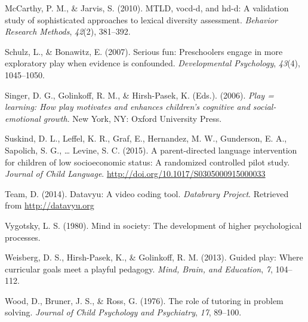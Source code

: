 \documentclass[10pt, letterpaper]{article}
\begin{document}
\hypertarget{ref-McCarthy2010}{}
McCarthy, P. M., \& Jarvis, S. (2010). MTLD, vocd-d, and hd-d: A
validation study of sophisticated approaches to lexical diversity
assessment. \emph{Behavior Research Methods}, \emph{42}(2), 381--392.

\hypertarget{ref-Schulz2007}{}
Schulz, L., \& Bonawitz, E. (2007). Serious fun: Preschoolers engage in
more exploratory play when evidence is confounded. \emph{Developmental
Psychology}, \emph{43}(4), 1045--1050.

\hypertarget{ref-Singer2006}{}
Singer, D. G., Golinkoff, R. M., \& Hirsh-Pasek, K. (Eds.). (2006).
\emph{Play = learning: How play motivates and enhances children's
cognitive and social-emotional growth}. New York, NY: Oxford University
Press.

\hypertarget{ref-Suskind2015}{}
Suskind, D. L., Leffel, K. R., Graf, E., Hernandez, M. W., Gunderson, E.
A., Sapolich, S. G., \ldots{} Levine, S. C. (2015). A parent-directed
language intervention for children of low socioeconomic status: A
randomized controlled pilot study. \emph{Journal of Child Language}.
\url{http://doi.org/10.1017/S0305000915000033}

\hypertarget{ref-datavyu}{}
Team, D. (2014). Datavyu: A video coding tool. \emph{Databrary Project}.
Retrieved from \url{http://datavyu.org}

\hypertarget{ref-Vygotsky1980}{}
Vygotsky, L. S. (1980). Mind in society: The development of higher
psychological processes.

\hypertarget{ref-Weisberg2013}{}
Weisberg, D. S., Hirsh-Pasek, K., \& Golinkoff, R. M. (2013). Guided
play: Where curricular goals meet a playful pedagogy. \emph{Mind, Brain,
and Education}, \emph{7}, 104--112.

\hypertarget{ref-Wood1976}{}
Wood, D., Bruner, J. S., \& Ross, G. (1976). The role of tutoring in
problem solving. \emph{Journal of Child Psychology and Psychiatry},
\emph{17}, 89--100.


\end{document}
